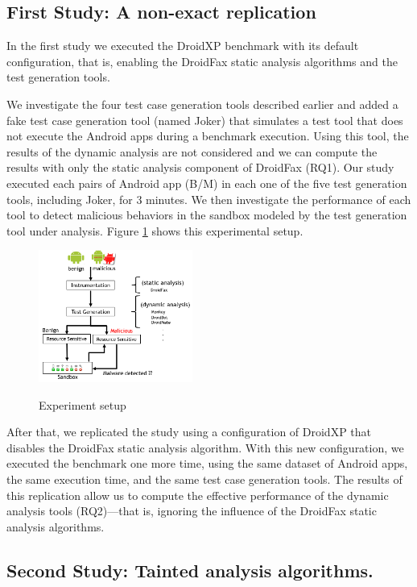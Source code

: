 \subsection{First Study: A non-exact replication}

In the first study we executed the DroidXP benchmark with its
default configuration, that is, enabling the DroidFax
static analysis algorithms and the test generation tools.

We investigate the four test case generation tools described earlier and added a fake test
case generation tool (named Joker) that simulates a test tool that does not execute
the Android apps during a benchmark execution. Using this tool, the results
of the dynamic analysis are not considered and we can compute the results with
only the static analysis component of DroidFax (RQ1). Our study executed each pairs of
Android app (B/M) in each one of the five test generation tools, including Joker,
for $3$ minutes. We then investigate the performance of each tool to detect
malicious behaviors in the sandbox modeled by the test generation tool
under analysis. Figure \ref{fig:setup} shows this experimental setup.

\begin{figure}[ht]
   \includegraphics[width=0.45\textwidth]{images/setup2.png}
   \label{Experiment setup}
   \caption{Experiment setup}
   \label{fig:setup}
 \end{figure}

After that, we replicated the study using a configuration of DroidXP that
disables the DroidFax static analysis algorithm. With this new configuration,
we executed the benchmark one more time, using the same dataset of Android
apps, the same execution time, and the same test case generation tools.
The results of this replication allow us to compute the effective performance
of the dynamic analysis tools (RQ2)---that is, ignoring the influence of the
DroidFax static analysis algorithms.

\subsection{Second Study: Tainted analysis algorithms.}

